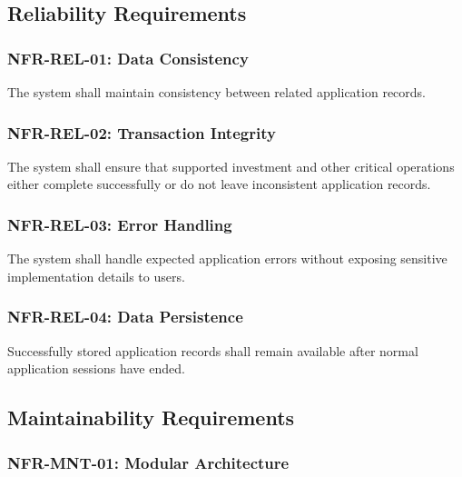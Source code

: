 
\subsection{Reliability Requirements}

\subsubsection{NFR-REL-01: Data Consistency}

The system shall maintain consistency between related application records.

\subsubsection{NFR-REL-02: Transaction Integrity}

The system shall ensure that supported investment and other critical
operations either complete successfully or do not leave inconsistent
application records.

\subsubsection{NFR-REL-03: Error Handling}

The system shall handle expected application errors without exposing
sensitive implementation details to users.

\subsubsection{NFR-REL-04: Data Persistence}

Successfully stored application records shall remain available after
normal application sessions have ended.



\subsection{Maintainability Requirements}

\subsubsection{NFR-MNT-01: Modular Architecture}

